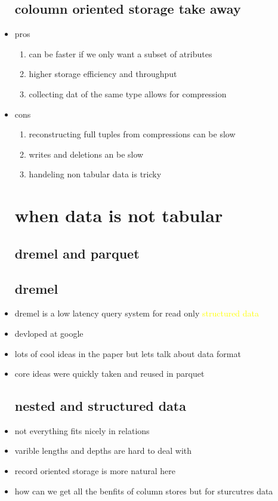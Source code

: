 \documentclass{article}
\begin{document}
\begin{itemize}
\subsection*{coloumn oriented storage take away}
\item pros 
\begin{enumerate}
    \item can be faster if we only want a subset of atributes 
    \item higher storage efficiency and throughput 
    \item collecting dat of the same type allows for compression 
\end{enumerate}
\item cons 
\begin{enumerate}
    \item reconstructing full tuples from compressions can be slow 
    \item writes and deletions an be slow 
    \item handeling non tabular data is tricky
\end{enumerate}
\section{when data is not tabular}
\subsection*{dremel and parquet }
\subsection*{dremel}
\item dremel is a low latency query system for read only \textcolor{yellow}{structured data}
\item devloped at google
\item lots of cool ideas in the paper but lets talk about data format 
\item core ideas were quickly taken and reused in parquet 
\subsection*{nested and structured data}
\item not everything fits nicely in relations 
\item varible lengths and depths are hard to deal with 
\item record oriented storage is more natural here 
\item how can we get all the benfits of column stores but for sturcutres data 

\end{itemize}
\end{document}
